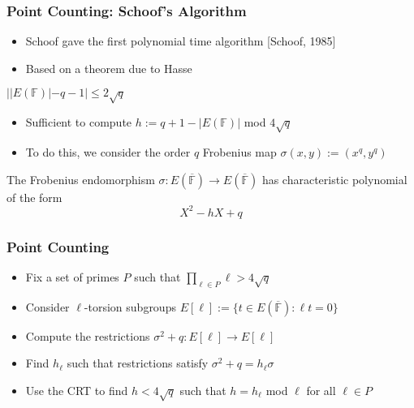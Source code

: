 \documentclass{beamer}
\begin{document}
\begin{frame}
\frametitle{Point Counting: Schoof's Algorithm}
\begin{itemize}
\item Schoof gave the first polynomial time algorithm [Schoof, 1985]
\item Based on a theorem due to Hasse
\end{itemize}

\begin{theorem}[Hasse]
$ | |E(\mathbb{F})| - q - 1  | \leq 2 \sqrt{q} $
\end{theorem}

\begin{itemize}
\item Sufficient to compute $ h := q + 1 - |E(\mathbb{F})|$ mod $4\sqrt{q}$
\item To do this, we consider the order $q$ Frobenius map $\sigma(x,y) := (x^q,y^q)$
\end{itemize}

\begin{theorem}
The Frobenius endomorphism $\sigma : E(\overline{\mathbb{F}}) \to E(\overline{\mathbb{F}})  $ has characteristic polynomial of the form
\[X^2 - hX + q\]
 
\end{theorem}


\end{frame}


\begin{frame}
\frametitle{Point Counting}
\begin{itemize}
\item Fix a set of primes $P$ such that $\prod_{\ell \in P} \ell > 4\sqrt{q}$
\item Consider $\ell$-torsion subgroups $E[\ell] := \{ t \in E(\overline{\mathbb{F}}) : \ell t = 0 \}$
\item Compute the restrictions $\sigma^2 + q : E[\ell] \to E[\ell]$
\item Find $h_{\ell}$ such that restrictions satisfy $\sigma^2 + q = h_{\ell} \sigma$
\item Use the CRT to find $h < 4\sqrt{q}$ such that $ h = h_{\ell}$ mod $\ell$ for all $\ell \in P$
\end{itemize}

\end{frame}


\end{document}
